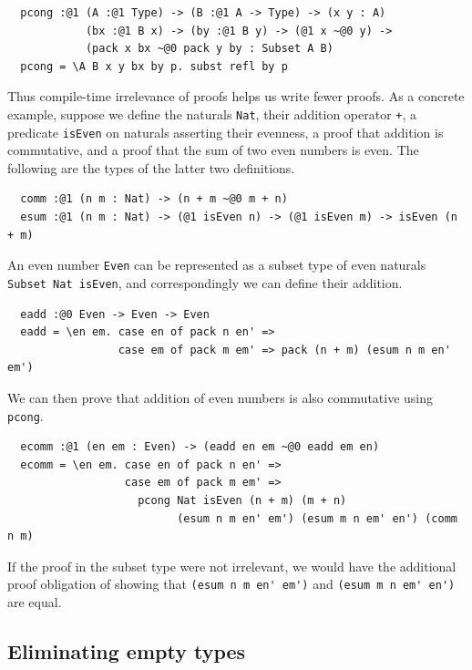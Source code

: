 \documentclass[acmsmall, screen=true, nonacm=true,
  review=\ifpublic false\else true\fi,
  anonymous=\ifanonymous true\else false\fi
]{acmart}
\begin{document}
\begin{lstlisting}
  pcong :@1 (A :@1 Type) -> (B :@1 A -> Type) -> (x y : A)
            (bx :@1 B x) -> (by :@1 B y) -> (@1 x ~@0 y) ->
            (pack x bx ~@0 pack y by : Subset A B)
  pcong = \A B x y bx by p. subst refl by p
\end{lstlisting}

Thus compile-time irrelevance of proofs helps us write fewer proofs.
As a concrete example, suppose we define the naturals \lstinline{Nat},
their addition operator \lstinline{+},
a predicate \lstinline{isEven} on naturals asserting their evenness,
a proof that addition is commutative,
and a proof that the sum of two even numbers is even.
The following are the types of the latter two definitions.

\begin{lstlisting}
  comm :@1 (n m : Nat) -> (n + m ~@0 m + n)
  esum :@1 (n m : Nat) -> (@1 isEven n) -> (@1 isEven m) -> isEven (n + m)
\end{lstlisting}

An even number \lstinline{Even} can be represented
as a subset type of even naturals \lstinline{Subset Nat isEven},
and correspondingly we can define their addition.

\begin{lstlisting}
  eadd :@0 Even -> Even -> Even
  eadd = \en em. case en of pack n en' =>
                 case em of pack m em' => pack (n + m) (esum n m en' em')
\end{lstlisting}

We can then prove that addition of even numbers is also commutative using \lstinline{pcong}.

\begin{lstlisting}
  ecomm :@1 (en em : Even) -> (eadd en em ~@0 eadd em en)
  ecomm = \en em. case en of pack n en' =>
                  case em of pack m em' =>
                    pcong Nat isEven (n + m) (m + n)
                          (esum n m en' em') (esum m n em' en') (comm n m)
\end{lstlisting}

If the proof in the subset type were not irrelevant,
we would have the additional proof obligation of showing that
\lstinline{(esum n m en' em')} and
\lstinline{(esum m n em' en')} are equal.

\subsection{Eliminating empty types}
\end{document}
